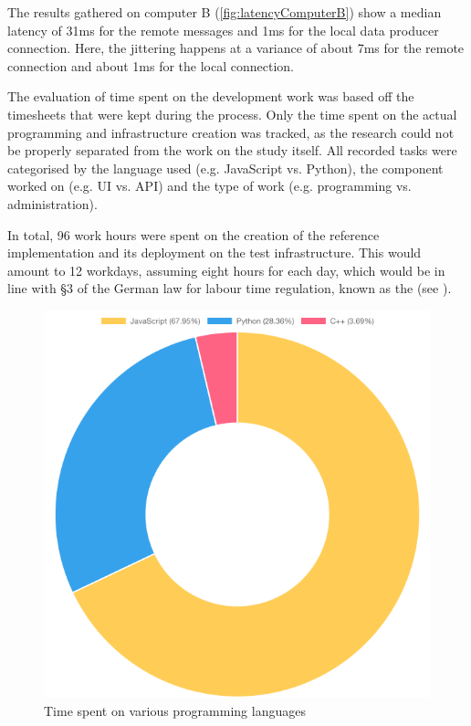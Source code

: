 The results gathered on computer B (\ref{fig:latencyComputerB}) show a median latency of 31ms for the remote messages and 1ms for the local data producer connection.
Here, the jittering happens at a variance of about 7ms for the remote connection and about 1ms for the local connection.

The evaluation of time spent on the development work was based off the timesheets that were kept during the process. Only the time spent on the actual programming and infrastructure creation was tracked, as the research could not be properly separated from the work on the study itself. All recorded tasks were categorised by the language used (e.g. JavaScript vs. Python), the component worked on (e.g. \ac{UI} vs. \ac{API}) and the type of work (e.g. programming vs. administration).

In total, 96 work hours were spent on the creation of the reference implementation and its deployment on the test infrastructure. This would amount to 12 workdays, assuming eight hours for each day, which would be in line with §3 of the German law for labour time regulation, known as the  (see \parencite{abzgPar3}).

\begin{figure}[h]
\centering
\includegraphics[scale=0.5]{04_Artefakte/01_Abbildungen/time-spent-on-languages}
\caption[Time spent on languages]{Time spent on various programming languages\protect}
\label{fig:timeSpentLanguages}
\end{figure}

